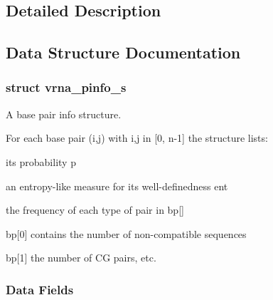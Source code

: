 \subsection{Detailed Description}


\subsection{Data Structure Documentation}
\label{structvrna__pinfo__s}
\hypertarget{group__aln__utils_structvrna__pinfo__s}{}
\subsubsection{struct vrna\+\_\+pinfo\+\_\+s}
A base pair info structure. 

For each base pair (i,j) with i,j in \mbox{[}0, n-\/1\mbox{]} the structure lists\+:
\begin{DoxyItemize}
\item its probability \textquotesingle{}p\textquotesingle{}
\item an entropy-\/like measure for its well-\/definedness \textquotesingle{}ent\textquotesingle{}
\item the frequency of each type of pair in \textquotesingle{}bp\mbox{[}\mbox{]}\textquotesingle{}
\begin{DoxyItemize}
\item \textquotesingle{}bp\mbox{[}0\mbox{]}\textquotesingle{} contains the number of non-\/compatible sequences
\item \textquotesingle{}bp\mbox{[}1\mbox{]}\textquotesingle{} the number of CG pairs, etc. 
\end{DoxyItemize}
\end{DoxyItemize}\subsubsection*{Data Fields}
